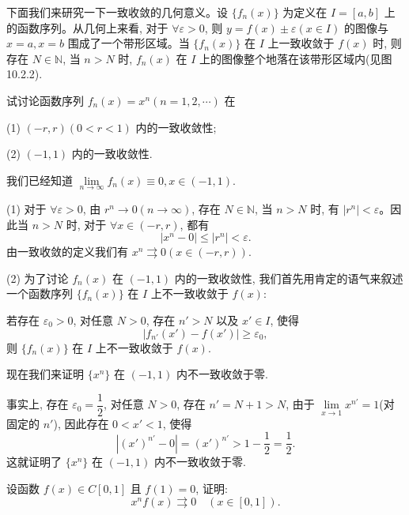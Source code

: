 下面我们来研究一下一致收敛的几何意义。设 $\{f_n(x)\}$ 为定义在 $I=[a,b]$ 上的函数序列。从几何上来看, 对于 $\forall\varepsilon>0$, 则 $y=f(x)\pm\varepsilon(x\in I)$ 的图像与 $x=a,x=b$ 围成了一个带形区域。当 $\{f_n(x)\}$ 在 $I$ 上一致收敛于 $f(x)$ 时, 则存在 $N\in\mathbb N$, 当 $n>N$ 时, $f_n(x)$ 在 $I$ 上的图像整个地落在该带形区域内(见图 10.2.2).

\begin{example}\label{example:ma-10-2-1}
试讨论函数序列 $f_n(x)=x^n(n=1,2,\cdots)$ 在

(1) $(-r,r)(0<r<1)$ 内的一致收敛性;

(2) $(-1,1)$ 内的一致收敛性.
\end{example}


\begin{solve}
我们已经知道 $\lim\limits_{n\to\infty}f_n(x)\equiv0,x\in(-1,1)$.

(1) 对于 $\forall\varepsilon>0$, 由 $r^n\to0(n\to\infty)$, 存在 $N\in\mathbb N$, 当 $n>N$ 时, 有 $|r^n|<\varepsilon$。因此当 $n>N$ 时, 对于 $\forall x\in(-r,r)$, 都有
\[
  |x^n-0|\leq |r^n|<\varepsilon.
\]
由一致收敛的定义我们有 $x^n\rightrightarrows0(x\in(-r,r))$.

(2) 为了讨论 $f_n(x)$ 在 $(-1,1)$ 内的一致收敛性, 我们首先用肯定的语气来叙述一个函数序列 $\{f_n(x)\}$ 在 $I$ 上不一致收敛于 $f(x)$:

若存在 $\varepsilon_0>0$, 对任意 $N>0$, 存在 $n'>N$ 以及 $x'\in I$, 使得
\[
  |f_{n'}(x')-f(x')|\geq\varepsilon_0,
\]
则 $\{f_n(x)\}$ 在 $I$ 上不一致收敛于 $f(x)$.

现在我们来证明 $\{x^n\}$ 在 $(-1,1)$ 内不一致收敛于零.

事实上, 存在 $\varepsilon_0=\dfrac12$, 对任意 $N>0$, 存在 $n'=N+1>N$, 由于 $\lim\limits_{x\to1}x^{n'}=1$(对固定的 $n'$), 因此存在 $0<x'<1$, 使得
\[
  |(x')^{n'}-0|=(x')^{n'}>1-\frac12=\frac12.
\]
这就证明了 $\{x^n\}$ 在 $(-1,1)$ 内不一致收敛于零.
\end{solve}


\begin{example}\label{example:ma-10-2-2}
设函数 $f(x)\in C[0,1]$ 且 $f(1)=0$, 证明:
\[
  x^nf(x)\rightrightarrows0\quad(x\in[0,1]).
\]
\end{example}


